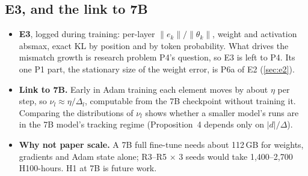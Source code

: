 \documentclass[11pt]{article}
\begin{document}
\subsection{E3, and the link to 7B}\label{sec:link7b}
\begin{itemize}
\item \textbf{E3}, logged during training: per-layer $\|e_k\|/\|\theta_k\|$, weight and activation absmax, exact KL by position and by token probability. What drives the mismatch growth is research problem P4's question, so E3 is left to P4. Its one P1 part, the stationary size of the weight error, is P6a of E2 (\cref{sec:e2}).
\item \textbf{Link to 7B.} Early in Adam training each element moves by about $\eta$ per step, so $\nu_l\approx\eta/\Delta_l$, computable from the 7B checkpoint without training it. Comparing the distributions of $\nu_l$ shows whether a smaller model's runs are in the 7B model's tracking regime (Proposition~4 depends only on $|d|/\Delta$).
\item \textbf{Why not paper scale.} A 7B full fine-tune needs about 112\,GB for weights, gradients and Adam state alone; R3--R5 $\times$ 3 seeds would take 1{,}400--2{,}700 H100-hours. H1 at 7B is future work.
\end{itemize}
\end{document}
